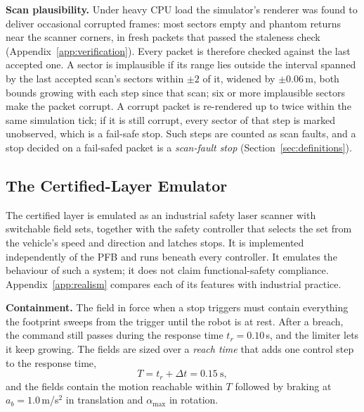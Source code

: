 \documentclass[sensors,article,submit,moreauthors]{Definitions/mdpi}
\begin{document}
\textbf{Scan plausibility.} Under heavy CPU load the simulator's renderer was found to deliver occasional corrupted frames: most sectors empty and phantom returns near the scanner corners, in fresh packets that passed the staleness check (Appendix~\ref{app:verification}). Every packet is therefore checked against the last accepted one. A sector is implausible if its range lies outside the interval spanned by the last accepted scan's sectors within $\pm 2$ of it, widened by $\pm 0.06$\,m, both bounds growing with each step since that scan; six or more implausible sectors make the packet corrupt. A corrupt packet is re-rendered up to twice within the same simulation tick; if it is still corrupt, every sector of that step is marked unobserved, which is a fail-safe stop. Such steps are counted as scan faults, and a stop decided on a fail-safed packet is a \emph{scan-fault stop} (Section~\ref{sec:definitions}).

\subsection{The Certified-Layer Emulator}\label{sec:emulator}

The certified layer is emulated as an industrial safety laser scanner with switchable field sets, together with the safety controller that selects the set from the vehicle's speed and direction and latches stops. It is implemented independently of the PFB and runs beneath every controller. It emulates the behaviour of such a system; it does not claim functional-safety compliance. Appendix~\ref{app:realism} compares each of its features with industrial practice.

\textbf{Containment.} The field in force when a stop triggers must contain everything the footprint sweeps from the trigger until the robot is at rest. After a breach, the command still passes during the response time $t_r = 0.10$\,s, and the limiter lets it keep growing. The fields are sized over a \emph{reach time} that adds one control step to the response time,
\begin{equation}
T = t_r + \Delta t = 0.15\ \text{s},
\label{eq:reachtime}
\end{equation}
and the fields contain the motion reachable within $T$ followed by braking at $a_b = 1.0$\,m/s$^2$ in translation and $\alpha_{\max}$ in rotation.
\end{document}
